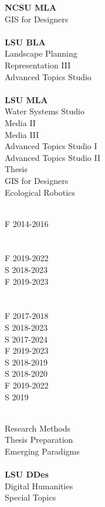 \documentclass[10pt]{designcv}
\begin{document}


\begin{minipage}[t]{0.3\textwidth} 
\textbf{NCSU MLA}\\
GIS for Designers\\
\ \\
\textbf{LSU BLA}\\
Landscape Planning\\
Representation III\\
Advanced Topics Studio\\
\ \\
\textbf{LSU MLA}\\
Water Systems Studio\\
Media II\\
Media III\\
Advanced Topics Studio I\\
Advanced Topics Studio II\\
Thesis\\
GIS for Designers\\
Ecological Robotics\\
\end{minipage}
\begin{minipage}[t]{0.2\textwidth} 
\ \\
F 2014-2016\\
\ \\
\ \\
F 2019-2022\\
S 2018-2023\\
F 2019-2023\\
\ \\
\ \\
F 2017-2018\\
S 2018-2023\\
S 2017-2024\\
F 2019-2023\\
S 2018-2019\\
S 2018-2020\\
F 2019-2022\\
S 2019\\
\end{minipage}
\begin{minipage}[t]{0.3\textwidth}
\ \\
Research Methods\\
Thesis Preparation\\
Emerging Paradigms\\
\ \\
\textbf{LSU DDes}\\
Digital Humanities\\
Special Topics\\
\end{minipage}
\end{document}
